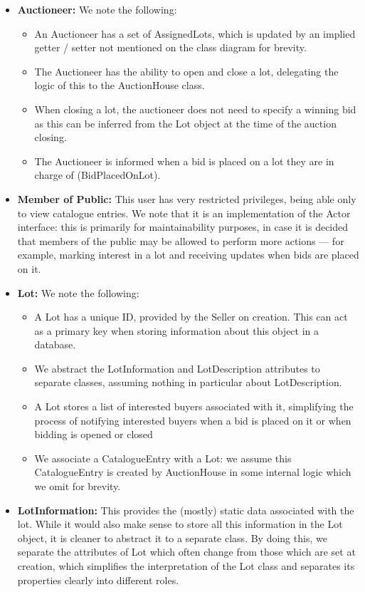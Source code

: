 \documentclass[titlepage, 12pt]{extarticle}
\begin{document}
\begin{itemize}
\begin{itemize}
\begin{enumerate}
    \end{enumerate}
  \end{itemize}
\item {\bf Auctioneer: } We note the following:
  \begin{itemize}
    \item An Auctioneer has a set of AssignedLots, which is updated by an implied getter / setter not mentioned on the class diagram for brevity. 
    \item The Auctioneer has the ability to open and close a lot, delegating the logic of this to the AuctionHouse class. 
    \item When closing a lot, the auctioneer does not need to specify a winning bid as this can be inferred from the Lot object at the time of the auction closing. 
    \item The Auctioneer is informed when a bid is placed on a lot they are in charge of (BidPlacedOnLot). 
  \end{itemize}
\item {\bf Member of Public: } This user has very restricted privileges, being able only to view catalogue entries. We note that it is an implementation of the Actor interface: this is primarily for maintainability purposes, in case it is decided that members of the public may be allowed to perform more actions --- for example, marking interest in a lot and receiving updates when bids are placed on it.
\item {\bf Lot: } We note the following:
  \begin{itemize}
    \item A Lot has a unique ID, provided by the Seller on creation. This can act as a primary key when storing information about this object in a database. 
    \item We abstract the LotInformation and LotDescription attributes to separate classes, assuming nothing in particular about LotDescription.
    \item A Lot stores a list of interested buyers associated with it, simplifying the process of notifying interested buyers when a bid is placed on it or when bidding is opened or closed
    \item We associate a CatalogueEntry with a Lot: we assume this CatalogueEntry is created by AuctionHouse in some internal logic which we omit for brevity.
  \end{itemize}
\item {\bf LotInformation: } This provides the (mostly) static data associated with the lot. While it would also make sense to store all this information in the Lot object, it is cleaner to abstract it to a separate class. By doing this, we separate the attributes of Lot which often change from those which are set at creation, which simplifies the interpretation of the Lot class and separates its properties clearly into different roles. 

\end{itemize}
\end{document}
